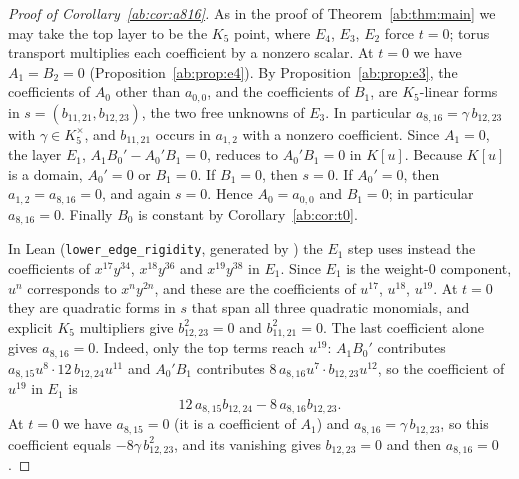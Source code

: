 \documentclass[a4paper,11pt]{article}
\newcommand{\filename}[1]{\texttt{\seqsplit{#1}}}
\theoremstyle{jsplain}
\theoremstyle{jsdef}
\theoremstyle{jsrem}
\begin{document}
\begin{proof}[Proof of Corollary~\ref{ab:cor:a816}]
As in the proof of Theorem~\ref{ab:thm:main} we may take the top layer to be the $K_5$ point, where $E_4$, $E_3$, $E_2$ force $t=0$; torus transport multiplies each coefficient by a nonzero scalar. At $t=0$ we have $A_1=B_2=0$ (Proposition~\ref{ab:prop:e4}). By Proposition~\ref{ab:prop:e3}, the coefficients of $A_0$ other than $a_{0,0}$, and the coefficients of $B_1$, are $K_5$-linear forms in $s=(b_{11,21},b_{12,23})$, the two free unknowns of $E_3$. In particular $a_{8,16}=\gamma\,b_{12,23}$ with $\gamma\in K_5^{\times}$, and $b_{11,21}$ occurs in $a_{1,2}$ with a nonzero coefficient. Since $A_1=0$, the layer $E_1$, $A_1B_0'-A_0'B_1=0$, reduces to $A_0'B_1=0$ in $K[u]$. Because $K[u]$ is a domain, $A_0'=0$ or $B_1=0$. If $B_1=0$, then $s=0$. If $A_0'=0$, then $a_{1,2}=a_{8,16}=0$, and again $s=0$. Hence $A_0=a_{0,0}$ and $B_1=0$; in particular $a_{8,16}=0$. Finally $B_0$ is constant by Corollary~\ref{ab:cor:t0}.

In Lean (\texttt{lower\_\allowbreak{}edge\_\allowbreak{}rigidity}, generated by \filename{lean/certgen/gen\_a816.py}) the $E_1$ step uses instead the coefficients of $x^{17}y^{34}$, $x^{18}y^{36}$ and $x^{19}y^{38}$ in $E_1$. Since $E_1$ is the weight-$0$ component, $u^n$ corresponds to $x^ny^{2n}$, and these are the coefficients of $u^{17}$, $u^{18}$, $u^{19}$. At $t=0$ they are quadratic forms in $s$ that span all three quadratic monomials, and explicit $K_5$ multipliers give $b_{12,23}^2=0$ and $b_{11,21}^2=0$. The last coefficient alone gives $a_{8,16}=0$. Indeed, only the top terms reach $u^{19}$: $A_1B_0'$ contributes $a_{8,15}u^8\cdot12\,b_{12,24}u^{11}$ and $A_0'B_1$ contributes $8\,a_{8,16}u^7\cdot b_{12,23}u^{12}$, so the coefficient of $u^{19}$ in $E_1$ is
\[
12\,a_{8,15}b_{12,24}-8\,a_{8,16}b_{12,23}.
\]
At $t=0$ we have $a_{8,15}=0$ (it is a coefficient of $A_1$) and $a_{8,16}=\gamma\,b_{12,23}$, so this coefficient equals $-8\gamma\,b_{12,23}^2$, and its vanishing gives $b_{12,23}=0$ and then $a_{8,16}=0$.


\end{proof}
\end{document}
